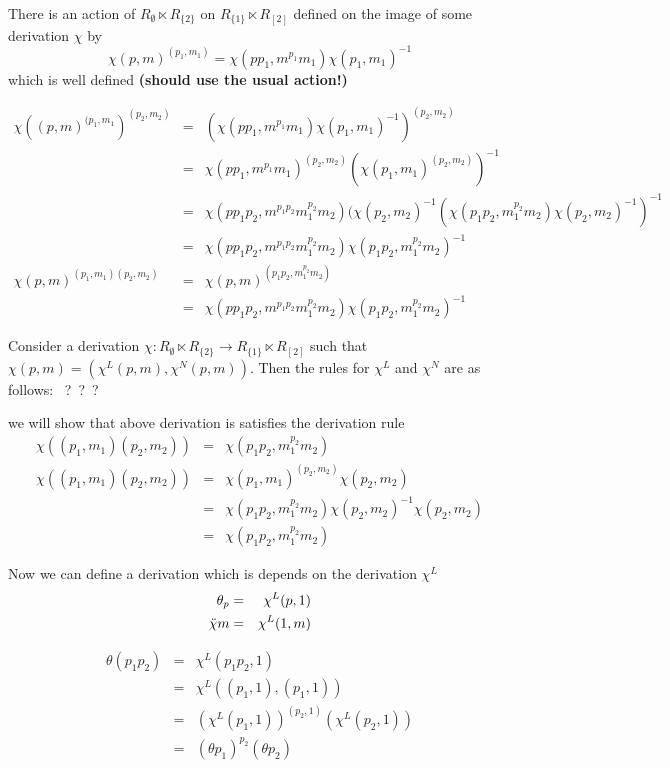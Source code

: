 \begin{lem}
There is an action of $R_{\emptyset} \ltimes R_{\{2\}}$ 
on $R_{\{1\}} \ltimes R_{[2]}$
defined on the image of some derivation $\chi$ by
$$
\chi(p,m)^{(p_1,m_1)} = \chi(pp_1, m^{p_1}m_1) \chi(p_1, m_1)^{-1} 
$$
which is well defined {\bf (should use the usual action!)}
\end{lem}
\begin{pf}
\begin{eqnarray*}
\chi((p,m)^{(p_1,m_1})^{(p_2,m_2)} 
  & = &  (\chi(pp_1, m^{p_1}m_1) \chi(p_1,m_1)^{-1})^{(p_2, m_2)} \\
  & = &  \chi(pp_1, m^{p_1}m_1)^{(p_2,m_2)} (\chi(p_1,m_1)^{(p_2,m_2)})^{-1} \\
  & = &  \chi(pp_1p_2, m^{p_1p_2}m_1^{p_2}m_2)(\chi(p_2,m_2)^{-1} 
          (\chi(p_1p_2,m_1^{p_2}m_2) \chi(p_2,m_2)^{-1})^{-1} \\
  & = &  \chi(pp_1p_2, m^{p_1p_2}m_1^{p_2}m_2) 
          \chi(p_1p_2, m_1^{p_2}m_2)^{-1} \\
\chi(p,m)^{(p_1,m_1)(p_2,m_2)} 
  & = &  \chi(p,m)^{(p_1p_2, m_1^{p_2}m_2)} \\
  & = &  \chi(pp_1p_2, m^{p_1p_2}m_1^{p_2}m_2) \chi(p_1p_2, m_1^{p_2}m_2)^{-1}
\end{eqnarray*}
\end{pf}
\begin{lem}
Consider a derivation 
$\chi: R_{\emptyset} \ltimes R_{\{2\}} \to R_{\{1\}} \ltimes R_{[2]}$ 
such that $\chi(p,m) = (\chi^L(p,m), \chi^{N}(p,m))$.
Then the rules for $\chi^L$ and $\chi^N$ are as follows: ~?~?~?
\end{lem}
\begin{pf}
we will show that above derivation is satisfies the derivation rule
\begin{eqnarray*}
\chi((p_1,m_1)(p_2,m_2)) 
  & = &  \chi(p_1p_2, m_1^{p_2}m_2) \\
\chi((p_1,m_1)(p_2,m_2)) 
  & = &  \chi(p_1,m_1)^{(p_2,m_2)} \chi(p_2,m_2) \\
  & = &  \chi(p_1p_2, m_1^{p_2}m_2) \chi(p_2,m_2)^{-1} \chi(p_2, m_2) \\
  & = &  \chi(p_1p_2, m_1^{p_2}m_2)
\end{eqnarray*}
\end{pf}
\begin{defn} 
Now we can define a derivation which is depends on the derivation ${\chi^L}$
\begin{eqnarray*}
\theta_p & = & \chi^{L}(p,1) \\
\ddot{\chi} m & = & \chi^{L}(1,m)
\end{eqnarray*}
\end{defn}
\begin{eqnarray*}
\theta(p_1p_2) 
  & = &  \chi^{L}(p_1p_2, 1) \\
  & = &  \chi^{L}((p_1,1),(p_1,1)) \\
  & = &  (\chi^{L}(p_1,1))^{(p_2,1)} (\chi^{L}(p_2,1)) \\
  & = &  (\theta p_1)^{p_2} (\theta p_2)
\end{eqnarray*}

